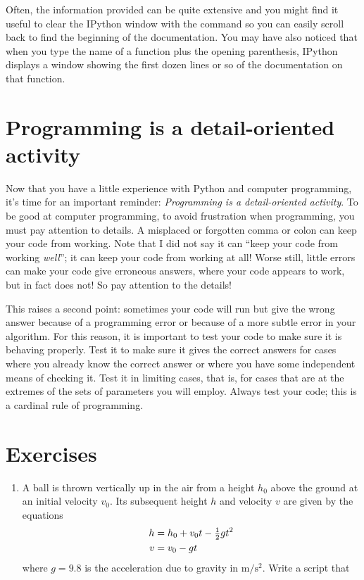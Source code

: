 \documentclass[letterpaper,10pt,english]{sphinxmanual}
\begin{document}
Often, the information provided can be quite extensive and you might find it useful to clear the IPython window with the  command so you can easily scroll back to find the beginning of the documentation.  You may have also noticed that when you type the name of a function plus the opening parenthesis, IPython displays a window showing the first dozen lines or so of the documentation on that function.


\section{Programming is a detail-oriented activity}
\label{chap2/chap2_basics:programming-is-a-detail-oriented-activity}
Now that you have a little experience with Python and computer programming, it's time for an important reminder: \emph{Programming is a detail-oriented activity}.  To be good at computer programming, to avoid frustration when programming, you must pay attention to details.  A misplaced or forgotten comma or colon can keep your code from working.  Note that I did not say it can ``keep your code from working \emph{well}''; it can keep your code from working at all!  Worse still, little errors can make your code give erroneous answers, where your code appears to work, but in fact does not!  So pay attention to the details!

This raises a second point: sometimes your code will run but give the wrong answer because of a programming error or because of a more subtle error in your algorithm.  For this reason, it is important to test your code to make sure it is behaving properly.  Test it to make sure it gives the correct answers for cases where you already know the correct answer or where you have some independent means of checking it.  Test it in limiting cases, that is, for cases that are at the extremes of the sets of parameters you will employ.  Always test your code; this is a cardinal rule of programming.
\newpage

\section{Exercises}
\label{chap2/chap2_basics:exercises}\begin{enumerate}
\item {} 
A ball is thrown vertically up in the air from a height \(h_0\) above the ground at an initial velocity \(v_0\). Its subsequent height \(h\) and velocity \(v\) are given by the equations
\begin{gather}
\begin{split}h &= h_0 + v_0t - \tfrac{1}{2}gt^2 \\
v &= v_0 - gt\end{split}\notag
\end{gather}
where \(g = 9.8\) is the acceleration due to gravity in \(\mathrm{m/s^2}\). Write a script that

\end{enumerate}
\end{document}
